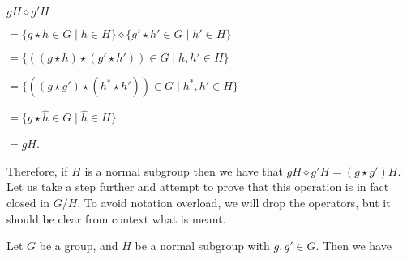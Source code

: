 \documentclass[12pt, a4paper]{article}
\begin{document}
        \centerline{$gH\diamond g'H$}
        
\vspace{2mm}

        \centerline{$=\{g\star h\in G\mid h\in H\}\diamond\{g'\star h'\in G\mid h'\in H\}$}
        
\vspace{2mm}

        \centerline{$=\{((g\star h)\star(g'\star h'))\in G\mid h,h'\in H\}$}
        
\vspace{2mm}

        \centerline{$=\{((g\star g')\star(h^{\ast}\star h'))\in G\mid h^{\ast},h'\in H\}$}
        
\vspace{2mm}

        \centerline{$=\{\hat{g}\star\hat{h}\in G\mid \hat{h}\in H\}$}
        
\vspace{2mm}

        \centerline{$=\hat{g}H$.}
        
\vspace{4mm}

    Therefore, if $H$ is a normal subgroup then we have that $gH\diamond g'H=(g\star g')H$. Let us take a step further and attempt to prove that this operation is in fact closed in $G/H$. To avoid notation overload, we will drop the operators, but it should be clear from context what is meant.\par
    
    Let $G$ be a group, and $H$ be a normal subgroup with $g,g'\in G$. Then we have\par
    
\vspace{4mm}
\end{document}
